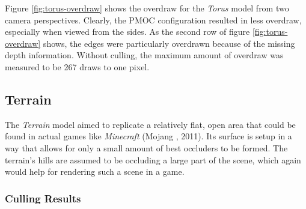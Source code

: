 \noindent
Figure \ref{fig:torus-overdraw} shows the overdraw for the \emph{Torus} model from two 
camera perspectives. Clearly, the \ac{PMOC} configuration resulted 
in less overdraw, especially when viewed from the sides. As the second row of figure 
\ref{fig:torus-overdraw} shows, the edges were particularly overdrawn because of the 
missing depth information. Without culling, the maximum amount of overdraw was measured 
to be 267 draws to one pixel.


\clearpage



\subsection*{Terrain}

The \emph{Terrain} model aimed to replicate a relatively flat, open area that could be found in actual 
games like \emph{Minecraft} (Mojang \cite{Mojang2024}, 2011). Its surface is setup in a way that allows 
for only a small amount of best occluders to be formed. The terrain's hills are assumed to be occluding 
a large part of the scene, which again would help for rendering such a scene in a game. 

\subsubsection*{Culling Results} \label{subsubsec-culling-results-terrain}


